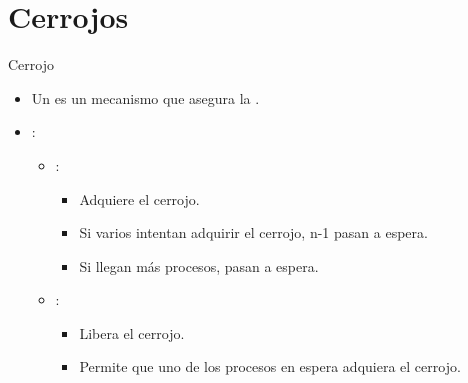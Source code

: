 \section{Cerrojos}

\begin{frame}[t]{Cerrojo}
\begin{itemize}
  \item Un  es un mecanismo que asegura la .

  \item {}:
    \begin{itemize}

      \item {}:
        \begin{itemize}
          \item Adquiere el cerrojo.
          \item Si varios intentan adquirir el cerrojo, n-1 pasan a espera.
          \item Si llegan más procesos, pasan a espera.
        \end{itemize}

      \item {}:
        \begin{itemize}
          \item Libera el cerrojo.
          \item Permite que uno de los procesos en espera adquiera el cerrojo.
        \end{itemize}
    \end{itemize}
\end{itemize}
\end{frame}

